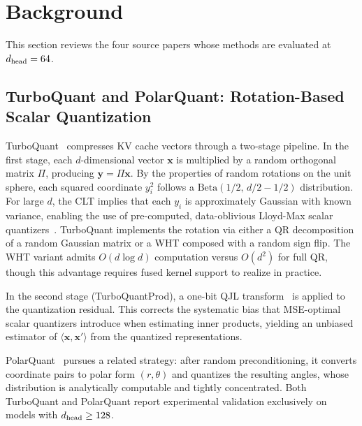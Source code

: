 
\section{Background}
\label{sec:background}

This section reviews the four source papers whose methods are evaluated
at $d_{\text{head}} = 64$.

\subsection{TurboQuant and PolarQuant: Rotation-Based Scalar Quantization}
\label{sec:bg:turboquant}

TurboQuant~\cite{zandieh2025turboquant} compresses KV cache vectors
through a two-stage pipeline.
In the first stage, each $d$-dimensional vector $\mathbf{x}$ is
multiplied by a random orthogonal matrix $\Pi$, producing
$\mathbf{y} = \Pi\mathbf{x}$.
By the properties of random rotations on the unit sphere, each squared
coordinate $y_i^2$ follows a
$\mathrm{Beta}(1/2,\, d/2 - 1/2)$ distribution.
For large $d$, the CLT implies that each $y_i$ is
approximately Gaussian with known variance, enabling the use of
pre-computed, data-oblivious Lloyd-Max scalar
quantizers~\cite{lloyd1982least}.
TurboQuant implements the rotation via either a QR decomposition of a
random Gaussian matrix or a WHT composed with a random sign flip.
The WHT variant admits $O(d \log d)$ computation versus $O(d^2)$ for
full QR, though this advantage requires fused kernel support to realize
in practice.

In the second stage (TurboQuantProd), a one-bit QJL
transform~\cite{zandieh2024qjl} is applied to the quantization residual.
This corrects the systematic bias that MSE-optimal scalar quantizers
introduce when estimating inner products, yielding an unbiased estimator
of $\langle \mathbf{x}, \mathbf{x}' \rangle$ from the quantized
representations.

PolarQuant~\cite{han2025polarquant} pursues a related strategy: after
random preconditioning, it converts coordinate pairs to polar form
$(r, \theta)$ and quantizes the resulting angles, whose distribution
is analytically computable and tightly concentrated.
Both TurboQuant and PolarQuant report experimental validation
exclusively on models with $d_{\text{head}} \geq 128$.

